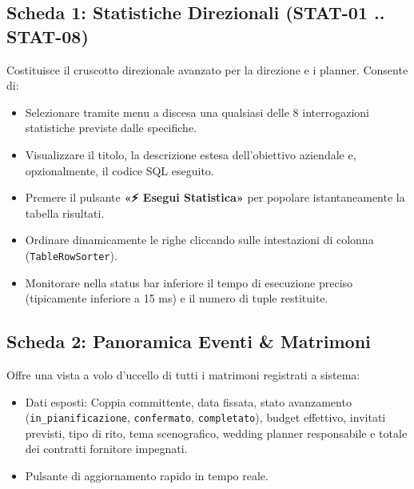 \subsection{Scheda 1: Statistiche Direzionali (STAT-01 .. STAT-08)}
Costituisce il cruscotto direzionale avanzato per la direzione e i planner. Consente di:
\begin{itemize}[noitemsep]
    \item Selezionare tramite menu a discesa una qualsiasi delle 8 interrogazioni statistiche previste dalle specifiche.
    \item Visualizzare il titolo, la descrizione estesa dell'obiettivo aziendale e, opzionalmente, il codice SQL eseguito.
    \item Premere il pulsante \textbf{«⚡ Esegui Statistica»} per popolare istantaneamente la tabella risultati.
    \item Ordinare dinamicamente le righe cliccando sulle intestazioni di colonna (\texttt{TableRowSorter}).
    \item Monitorare nella status bar inferiore il tempo di esecuzione preciso (tipicamente inferiore a 15 ms) e il numero di tuple restituite.
\end{itemize}

\subsection{Scheda 2: Panoramica Eventi \& Matrimoni}
Offre una vista a volo d'uccello di tutti i matrimoni registrati a sistema:
\begin{itemize}[noitemsep]
    \item Dati esposti: Coppia committente, data fissata, stato avanzamento (\texttt{in\_pianificazione}, \texttt{confermato}, \texttt{completato}), budget effettivo, invitati previsti, tipo di rito, tema scenografico, wedding planner responsabile e totale dei contratti fornitore impegnati.
    \item Pulsante di aggiornamento rapido in tempo reale.
\end{itemize}


